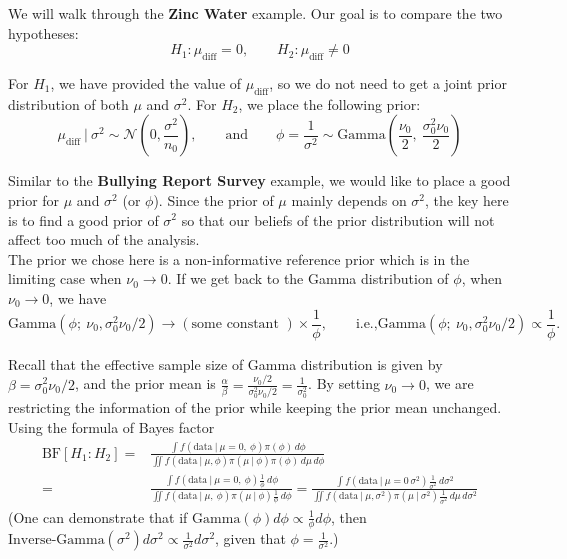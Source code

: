 \documentclass{article}
\def\dsst{\displaystyle}
\begin{document}
We will walk through the \textbf{Zinc Water} example. Our goal is to compare the two hypotheses:
$$ H_1: \mu_\text{diff} = 0,\qquad H_2: \mu_\text{diff}\neq 0 $$

For $H_1$, we have provided the value of $\mu_\text{diff}$, so we do not need to get a joint prior distribution of both $\mu$ and $\sigma^2$. For $H_2$, we place the following prior:
$$ \mu_\text{diff}~|~ \sigma^2 \sim \mathcal{N}(0, \frac{\sigma^2}{n_0}),\qquad \text{and}\qquad \phi = \frac{1}{\sigma^2} \sim \text{Gamma}(\frac{\nu_0}{2},\ \frac{\sigma_0^2\nu_0}{2}) $$

Similar to the \textbf{Bullying Report Survey} example, we would like to place a good prior for $\mu$ and $\sigma^2$ (or $\phi$). Since the prior of $\mu$ mainly depends on $\sigma^2$, the key here is to find a good prior of $\sigma^2$ so that our beliefs of the prior distribution will not affect too much of the analysis.\\

The prior we chose here is a non-informative reference prior which is in the limiting case when $\nu_0\rightarrow 0$. If we get back to the Gamma distribution of $\phi$, when $\nu_0\rightarrow 0$, we have
$$ \text{Gamma}(\phi;\ \nu_0, \sigma_0^2\nu_0/2) \rightarrow (\text{some constant })\times \frac{1}{\phi},\qquad \text{i.e.,} \text{Gamma}(\phi;\ \nu_0, \sigma_0^2\nu_0/2) \propto \frac{1}{\phi}. $$

Recall that the effective sample size of Gamma distribution is given by $\beta = \sigma_0^2\nu_0/2$, and the prior mean is $\dsst \frac{\alpha}{\beta} = \frac{\nu_0/2}{\sigma_0^2\nu_0/2} = \frac{1}{\sigma_0^2}$. By setting $\nu_0\rightarrow0$, we are restricting the information of the prior while keeping the prior mean unchanged.\\

Using the formula of Bayes factor
\begin{align*} 
\text{BF}[H_1:H_2] = & \frac{\dsst \int f(\text{data}~|~\mu = 0,\ \phi)\pi(\phi)\, d\phi}{\dsst \iint f(\text{data}~|~\mu, \phi)\pi(\mu~|~\phi)\pi(\phi)\, d\mu\, d\phi} \\
= & \frac{\dsst \int f(\text{data}~|~\mu=0,\ \phi)\frac{1}{\phi}\, d\phi}{\dsst \iint f(\text{data}~|~\mu,\ \phi)\pi(\mu~|~\phi)\frac{1}{\phi}\, d\phi}
= \frac{\dsst \int f(\text{data}~|~\mu=0\, \sigma^2)\frac{1}{\sigma^2}\, d\sigma^2}{\dsst \iint f(\text{data}~|~\mu, \sigma^2)\pi(\mu~|~\sigma^2)\frac{1}{\sigma^2}\, d\mu\, d\sigma^2}
\end{align*}
(One can demonstrate that if $\text{Gamma}(\phi)d\phi\propto \dsst \frac{1}{\phi}d\phi$, then $\text{Inverse-Gamma}(\sigma^2)d\sigma^2\propto \dsst \frac{1}{\sigma^2}d\sigma^2$, given that $\phi =\dsst \frac{1}{\sigma^2}$.)\\
\end{document}

